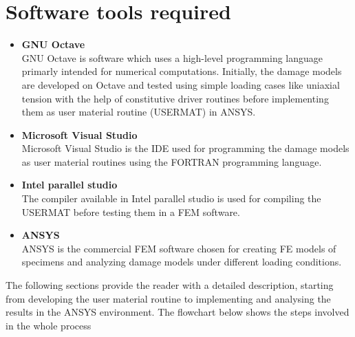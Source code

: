 \documentclass[12pt,a4paper,twoside,openright]{report}
\begin{document}
\section{Software tools required}
\begin{itemize}
\item \textbf{GNU Octave}\\ \indent
\hspace*{13mm} GNU Octave is software which uses a high-level programming language primarly intended for numerical computations. Initially, the damage models are developed on Octave and tested using simple loading cases like uniaxial tension with the help of constitutive driver routines \citep{codes} before implementing them as user material routine (USERMAT) in ANSYS. 
\item \textbf{Microsoft Visual Studio }\\
\hspace*{13mm} Microsoft Visual Studio is the IDE used for programming the damage models as user material routines using the FORTRAN programming language.
\item \textbf{Intel parallel studio}\\
\hspace*{13mm} The compiler available in Intel parallel studio is used for compiling the USERMAT before testing them in a FEM software.
\item \textbf{ANSYS }\\
\hspace*{13mm}ANSYS is the commercial FEM software chosen for creating FE models of specimens and analyzing damage models under different loading conditions.
\end{itemize}

The following sections provide the reader with a detailed description, starting from developing the user material routine to implementing and analysing the results in the ANSYS environment.  The flowchart below shows the steps involved in the whole process\\
\begin{center}

\label{Schematic of USERMAT implementation}
\end{center}
\FloatBarrier
\end{document}
